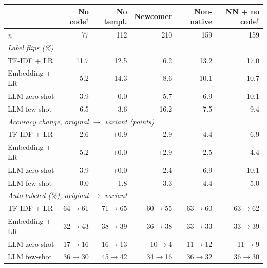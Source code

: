 \begin{tabular}{lrrrrr}
\toprule
 & No code$^\dagger$ & No templ. & Newcomer & Non-native & NN + no code$^\dagger$ \\
\midrule
\emph{n} & 77 & 112 & 210 & 159 & 159 \\
\multicolumn{6}{l}{\emph{Label flips (\%)}} \\
TF-IDF + LR & 11.7 & 12.5 & 6.2 & 13.2 & 17.0 \\
Embedding + LR & 5.2 & 14.3 & 8.6 & 10.1 & 10.7 \\
LLM zero-shot & 3.9 & 0.0 & 5.7 & 6.9 & 10.1 \\
LLM few-shot & 6.5 & 3.6 & 16.2 & 7.5 & 9.4 \\
\multicolumn{6}{l}{\emph{Accuracy change, original $\to$ variant (points)}} \\
TF-IDF + LR & -2.6 & +0.9 & -2.9 & -4.4 & -6.9 \\
Embedding + LR & -5.2 & +0.0 & +2.9 & -2.5 & -4.4 \\
LLM zero-shot & -3.9 & +0.0 & -2.4 & -6.9 & -10.1 \\
LLM few-shot & +0.0 & -1.8 & -3.3 & -4.4 & -5.0 \\
\multicolumn{6}{l}{\emph{Auto-labeled (\%), original $\to$ variant}} \\
TF-IDF + LR & 64$\to$61 & 71$\to$65 & 60$\to$55 & 63$\to$60 & 63$\to$62 \\
Embedding + LR & 32$\to$43 & 38$\to$39 & 36$\to$38 & 33$\to$33 & 33$\to$39 \\
LLM zero-shot & 17$\to$16 & 16$\to$13 & 10$\to$4 & 11$\to$12 & 11$\to$9 \\
LLM few-shot & 36$\to$30 & 45$\to$42 & 34$\to$16 & 36$\to$32 & 36$\to$30 \\
\bottomrule
\end{tabular}
